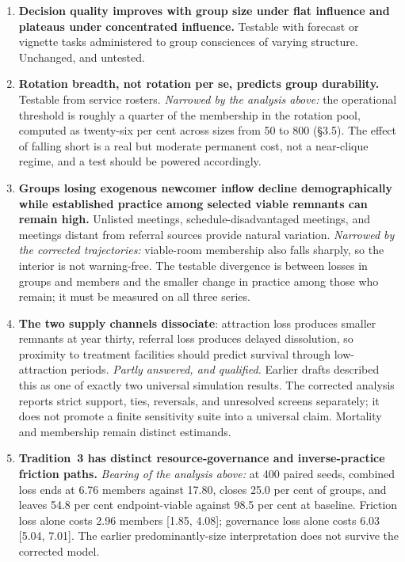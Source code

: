 \documentclass[11pt,a4paper]{article}
\begin{document}
\begin{enumerate}
\item \textbf{Decision quality improves with group size under flat influence and
plateaus under concentrated influence.} Testable with forecast or vignette tasks
administered to group consciences of varying structure. Unchanged, and untested.

\item \textbf{Rotation breadth, not rotation per se, predicts group durability.}
Testable from service rosters. \emph{Narrowed by the analysis above:} the operational threshold is
roughly a quarter of the membership in the rotation pool, computed as
twenty-six per cent across sizes from 50 to 800 (\S3.5). The effect of falling
short is a real but moderate permanent cost, not a near-clique regime, and a test
should be powered accordingly.

\item \textbf{Groups losing exogenous newcomer inflow decline demographically
while established practice among selected viable remnants can remain high.}
Unlisted meetings, schedule-disadvantaged meetings, and meetings distant from
referral sources provide natural variation. \emph{Narrowed by the corrected
trajectories:} viable-room membership also falls sharply, so the interior is not
warning-free. The testable divergence is between losses in groups and members and
the smaller change in practice among those who remain; it must be measured on all
three series.

\item \textbf{The two supply channels dissociate}: attraction loss produces smaller
remnants at year thirty, referral loss produces delayed dissolution, so proximity to treatment
facilities should predict survival through low-attraction periods. \emph{Partly
answered, and qualified.} Earlier drafts described this as one of exactly two
universal simulation results. The corrected analysis reports strict support,
ties, reversals, and unresolved screens separately; it does not promote a finite
sensitivity suite into a universal claim. Mortality and membership remain
distinct estimands.

\item \textbf{Tradition~3 has distinct resource-governance and inverse-practice
friction paths.} \emph{Bearing of the analysis above:} at 400 paired seeds, combined
loss ends at 6.76 members against 17.80, closes 25.0 per cent of groups, and leaves
54.8 per cent endpoint-viable against 98.5 per cent at baseline. Friction loss alone
costs 2.96 members [1.85, 4.08]; governance loss alone costs 6.03 [5.04, 7.01].
The earlier predominantly-size interpretation does not survive the corrected model.


\end{enumerate}
\end{document}
